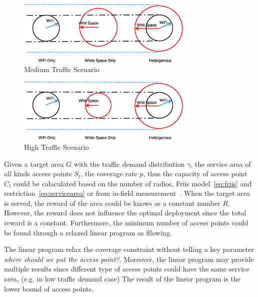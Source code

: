 \begin{figure}
\centering
\includegraphics[width=84mm]{figures/mediumtraffic}
\vspace{-0.1in}
\caption{Medium Traffic Scenario}                                                                 
\label{fig:mediumtraffic}
\vspace{-0.1in}
\end{figure}


\begin{figure}
\centering
\includegraphics[width=84mm]{figures/hightraffic}
\vspace{-0.1in}
\caption{High Traffic Scenario}                                                                 
\label{fig:hightraffic}
\vspace{-0.1in}
\end{figure}

Given a target area $G$ with the traffic demand distribution $\gamma$, the service area 
of all kinds access points $S_t$, the coverage rate $p$, thus the capacity of access point $C_t$ could 
be calaculated based on the number of radios, Friis model~\ref{eq:friis} and restriction~\ref{eq:servicearea}
or from in-field measurement~\cite{cuileveraging}. When the target area is served, the reward of the area 
could be knows as a constant number $R$. However, the reward does not influence the optimal deployment since 
the total reward is a constant. Furthermore, the minimum number of access points could be found through 
a relaxed linear program as fllowing. 



The linear program relax the coverage constraint without telling a key parameter
{\it where should we put the access point?}. Moreover, the linear program may provide 
multiple results since different type of access points could have the same service area, 
(e.g. in low traffic demand case) The result of the linear program is the lower bound of 
access points. 

